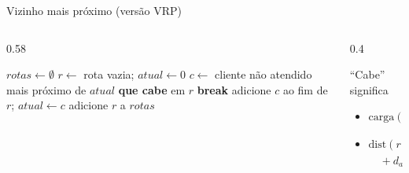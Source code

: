 \documentclass[aspectratio=169,xcolor=table]{beamer}
\begin{document}
\begin{frame}{Vizinho mais próximo (versão VRP)}
  \begin{columns}[c]
    \begin{column}{0.58\textwidth}
      \begin{algorithmic}[1]
        \State $rotas \gets \emptyset$
          \State $r \gets$ rota vazia; $atual \gets 0$
          \Loop
            \State $c \gets$ cliente não atendido mais próximo de $atual$ \textbf{que cabe} em $r$
             \textbf{break} \EndIf
            \State adicione $c$ ao fim de $r$; $atual \gets c$
          \EndLoop
          \State adicione $r$ a $rotas$
        \EndWhile
      \end{algorithmic}
    \end{column}
    \begin{column}{0.4\textwidth}
      \begin{block}{``Cabe'' significa}
        \small
        \begin{itemize}
          \item $\text{carga}(r) + q_c \le Q$
          \item $\text{dist}(r) - d_{atual,0}$\\ $\quad + d_{atual,c} + d_{c,0} \le L$
        \end{itemize}
      \end{block}
    \end{column}
  \end{columns}
\end{frame}
\end{document}
